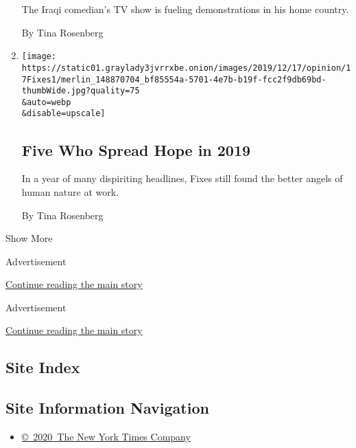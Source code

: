 \begin{enumerate}
  The Iraqi comedian's TV show is fueling demonstrations in his home
  country.

  By Tina Rosenberg
\item
  \href{/2019/12/17/opinion/spread-hope-2019.html}{}

  \texttt{[image: https://static01.graylady3jvrrxbe.onion/images/2019/12/17/opinion/17Fixes1/merlin\_148870704\_bf85554a-5701-4e7b-b19f-fcc2f9db69bd-thumbWide.jpg?quality=75\\\&auto=webp\\\&disable=upscale]}

  \hypertarget{five-who-spread-hope-in-2019}{%
  \subsection{Five Who Spread Hope in
  2019}\label{five-who-spread-hope-in-2019}}

  In a year of many dispiriting headlines, Fixes still found the better
  angels of human nature at work.

  By Tina Rosenberg
\end{enumerate}

Show More

Advertisement

\protect\hyperlink{after-mid1}{Continue reading the main story}

Advertisement

\protect\hyperlink{after-mktg}{Continue reading the main story}

\hypertarget{site-index}{%
\subsection{Site Index}\label{site-index}}

\hypertarget{site-information-navigation}{%
\subsection{Site Information
Navigation}\label{site-information-navigation}}

\begin{itemize}
\tightlist
\item
  \href{https://help.nytimes3xbfgragh.onion/hc/en-us/articles/115014792127-Copyright-notice}{©~2020~The
  New York Times Company}
\end{itemize}


